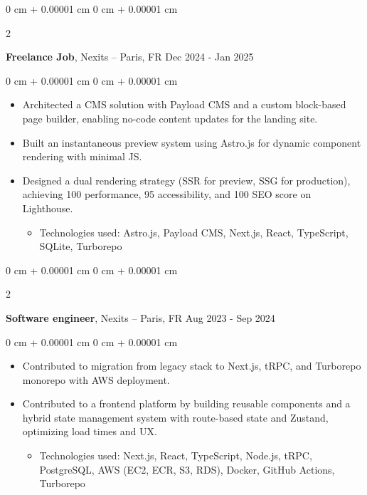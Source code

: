 \documentclass[10pt, letterpaper]{article}
\newenvironment{highlights}{
  \begin{itemize}[
    topsep=0.10 cm,
    parsep=0.10 cm,
    partopsep=0pt,
    itemsep=0pt,
    leftmargin=0 cm + 10pt
    ]
  }{
\end{itemize}
}
\newenvironment{highlightsforbulletentries}{
  \begin{itemize}[
    topsep=0 cm,
    parsep=0.10 cm,
    partopsep=0pt,
    itemsep=0pt,
    leftmargin=10pt
    ]
  }{
\end{itemize}
} %
\newenvironment{onecolentry}{
  \begin{adjustwidth}{
      0 cm + 0.00001 cm
    }{
      0 cm + 0.00001 cm
    }
  }{
  \end{adjustwidth}
} %
\newenvironment{twocolentry}[2][]{
  \onecolentry
  \def\secondColumn{#2}
  \setcolumnwidth{\fill, 4.5 cm}
  \begin{paracol}{2}
  }{
    \switchcolumn \raggedleft \secondColumn
  \end{paracol}
  \end{onecolentry}
} %
\begin{document}
  \vspace{0.2 cm}

  \begin{twocolentry}{
      Dec 2024 - Jan 2025
    }
  \textbf{Freelance Job}, Nexits  -- Paris, FR\end{twocolentry}

  \vspace{0.10 cm}
  \begin{onecolentry}
    \begin{highlights}
  \item Architected a CMS solution with Payload CMS and a custom block-based page builder, enabling no-code content updates for the landing site.
  \item Built an instantaneous preview system using Astro.js for dynamic component rendering with minimal JS.
  \item Designed a dual rendering strategy (SSR for preview, SSG for production), achieving 100 performance, 95 accessibility, and 100 SEO score on Lighthouse.

          \begin{highlightsforbulletentries}
    \item Technologies used: Astro.js, Payload CMS, Next.js, React, TypeScript, SQLite, Turborepo
    \end{highlightsforbulletentries}

    \end{highlights}

  \end{onecolentry}




  \begin{twocolentry}{
      Aug 2023 - Sep 2024
    }
  \textbf{Software engineer}, Nexits  -- Paris, FR\end{twocolentry}

  \vspace{0.10 cm}
  \begin{onecolentry}
    \begin{highlights}

  \item Contributed to migration from legacy stack to Next.js, tRPC, and Turborepo monorepo with AWS deployment.
\item Contributed to a frontend platform by building reusable components and a hybrid state management system with route-based state and Zustand, optimizing load times and UX.

                \begin{highlightsforbulletentries}
    \item Technologies used: Next.js, React, TypeScript, Node.js, tRPC, PostgreSQL, AWS (EC2, ECR, S3, RDS), Docker, GitHub Actions, Turborepo
    \end{highlightsforbulletentries}


    \end{highlights}

  \end{onecolentry}
\end{document}
